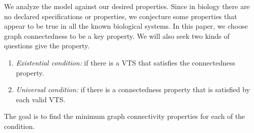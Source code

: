 We analyze the model against our desired properties.
%
Since in biology there are no declared specifications or properties,
we conjecture some properties that appear to be true in all the known
biological systems.
%
In this paper, we choose graph connectedness to be a key property.
%
We will also seek two kinds of questions give the property.


\begin{enumerate}
\item {\em Existential condition:}
if there is a VTS that satisfies the connectedness property. 

\item {\em Universal condition:}
  if there is a connectedness property that is satisfied by each valid VTS.
\end{enumerate}

The goal is to find the minimum graph connectivity properties for each of the condition.



